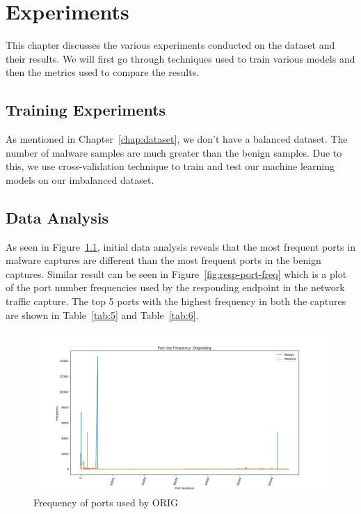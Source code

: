 \chapter{Experiments\label{chap:experiments}}

This chapter discusses the various experiments conducted on the dataset and their results. We will first go through techniques used to train various models and then the metrics used to compare the results.

\section{Training Experiments}

As mentioned in Chapter~\ref{chap:dataset}, we don't have a balanced dataset. The number of malware samples are much greater than the benign samples. Due to this, we use cross-validation technique to train and test our machine learning models on our imbalanced dataset.

\section{Data Analysis}

As seen in Figure~\ref{fig:orig-port-freq}, initial data analysis reveals that the most frequent ports in malware captures are different than the most frequent ports in the benign captures. Similar result can be seen in Figure~\ref{fig:resp-port-freq} which is a plot of the port number frequencies used by the responding endpoint in the network traffic capture. The top 5 ports with the highest frequency in both the captures are shown in Table~\ref{tab:5} and Table~\ref{tab:6}.

\begin{figure}[htb]
	\centering
	\includegraphics[width=1\textwidth]{images/orig-port-freq.png}
	\caption{Frequency of ports used by ORIG} 
	\label{fig:orig-port-freq}
\end{figure}

